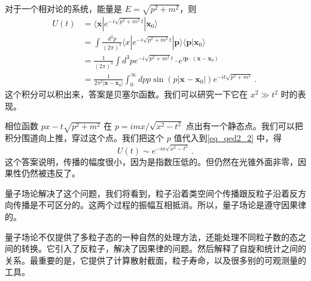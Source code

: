 对于一个相对论的系统，能量是 $E = \sqrt{p^2+m^2}$，则
\begin{equation}
\begin{aligned}
U(t) & = \langle \mathbf x | e^{-i\sqrt{p^2+m^2}t}|\mathbf x_0\rangle \\
& = \int \frac{d^3 p}{(2\pi)^3} \langle x | e^{-i\sqrt{p^2+m^2}t} | \mathbf p \rangle \langle \mathbf p | \mathbf x_0 \rangle \\
& = \frac{1}{(2\pi)^3} \int d^3 p e^{- i \sqrt{p^2+m^2} t}\cdot e^{i\mathbf p \cdot (\mathbf x - \mathbf x_0) } \\
& =  \frac{1}{2\pi^2|\mathbf x - \mathbf x_0|}
\int _0^\infty d p p \sin(p|\mathbf x - \mathbf x_0|) e^{-it \sqrt{p^2+m^2}}~.
\end{aligned}~
\end{equation}
这个积分可以积出来，答案是贝塞尔函数。我们可以研究一下它在 $x^2\gg t^2$ 时的表现。

相位函数 $px-t\sqrt{p^2+m^2}$ 在 $p=imx/\sqrt{x^2-t^2}$ 点出有一个静态点。我们可以把积分围道向上推，穿过这个点。我们把这个 $p$ 值代入到\autoref{eq_qed2_2} 中，得
\begin{equation}
U(t)\sim e^{-m\sqrt{x^2-t^2}}~.
\end{equation}
这个答案说明，传播的幅度很小，因为是指数压低的。但仍然在光锥外面非零，因果性仍然被违反了。

量子场论解决了这个问题，我们将看到，粒子沿着类空间个传播跟反粒子沿着反方向传播是不可区分的。这两个过程的振幅互相抵消。所以，量子场论是遵守因果律的。

量子场论不仅提供了多粒子态的一种自然的处理方法，还能处理不同粒子数的态之间的转换。它引入了反粒子，解决了因果律的问题。然后解释了自旋和统计之间的关系。最重要的是，它提供了计算散射截面，粒子寿命，以及很多别的可观测量的工具。

